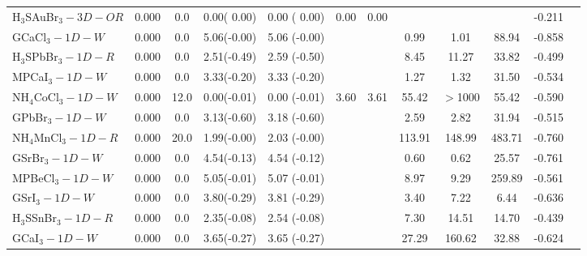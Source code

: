 \begin{table*}
\begin{tabular*}{0.98\textwidth}{@{\extracolsep{\fill}}l c c c c c c c c c c c}
H$_3$SAuBr$_3-3D-OR$&      0.000&        0.0&       0.00( 0.00)&            0.00  ( 0.00)&       0.00&            0.00&                &                &                &     -0.211\\
      GCaCl$_3-1D-W$&      0.000&        0.0&       5.06(-0.00)&            5.06  (-0.00)&           &                &            0.99&            1.01&           88.94&     -0.858\\
 H$_3$SPbBr$_3-1D-R$&      0.000&        0.0&       2.51(-0.49)&            2.59  (-0.50)&           &                &            8.45&           11.27&           33.82&     -0.499\\
      MPCaI$_3-1D-W$&      0.000&        0.0&       3.33(-0.20)&            3.33  (-0.20)&           &                &            1.27&            1.32&           31.50&     -0.534\\
 NH$_4$CoCl$_3-1D-W$&      0.000&       12.0&       0.00(-0.01)&            0.00  (-0.01)&       3.60&            3.61&           55.42&         $>$1000&           55.42&     -0.590\\
      GPbBr$_3-1D-W$&      0.000&        0.0&       3.13(-0.60)&            3.18  (-0.60)&           &                &            2.59&            2.82&           31.94&     -0.515\\
 NH$_4$MnCl$_3-1D-R$&      0.000&       20.0&       1.99(-0.00)&            2.03  (-0.00)&           &                &          113.91&          148.99&          483.71&     -0.760\\
      GSrBr$_3-1D-W$&      0.000&        0.0&       4.54(-0.13)&            4.54  (-0.12)&           &                &            0.60&            0.62&           25.57&     -0.761\\
     MPBeCl$_3-1D-W$&      0.000&        0.0&       5.05(-0.01)&            5.07  (-0.01)&           &                &            8.97&            9.29&          259.89&     -0.561\\
       GSrI$_3-1D-W$&      0.000&        0.0&       3.80(-0.29)&            3.81  (-0.29)&           &                &            3.40&            7.22&            6.44&     -0.636\\
 H$_3$SSnBr$_3-1D-R$&      0.000&        0.0&       2.35(-0.08)&            2.54  (-0.08)&           &                &            7.30&           14.51&           14.70&     -0.439\\
       GCaI$_3-1D-W$&      0.000&        0.0&       3.65(-0.27)&            3.65  (-0.27)&           &                &           27.29&          160.62&           32.88&     -0.624\\

\end{tabular*}
\end{table*}
